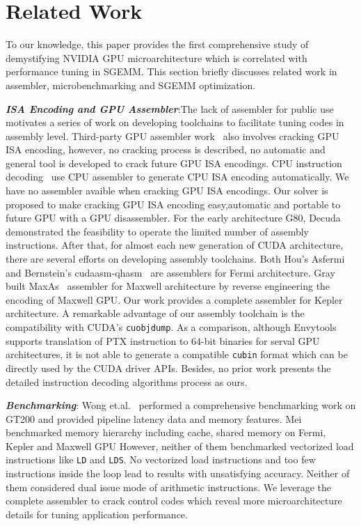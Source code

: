 \section{Related Work}
\label{sec:related}
To our knowledge, this paper provides the first comprehensive study of demystifying NVIDIA GPU microarchitecture which 
is correlated with performance tuning in SGEMM. This section briefly discusses related work in assembler, 
microbenchmarking and SGEMM optimization.

{\em {\bf ISA Encoding and GPU Assembler}}:The lack of assembler for public use motivates a series of work on developing toolchains to facilitate tuning codes in assembly level.
Third-party GPU assembler work~\cite{decuda,asfermi,maxas} also
involves cracking GPU ISA encoding, however, no cracking process is described,
no automatic and general tool is developed to crack future GPU ISA
encodings. CPU instruction decoding~\cite{collberg1997reverse,engler2000derive} use CPU assembler
to generate CPU ISA encoding automatically. We have no assembler avaible when cracking GPU ISA encodings. 
Our solver is proposed to make cracking GPU ISA encoding easy,automatic and portable to future GPU with a GPU disassembler.
For the early architecture G80, Decuda~\cite{decuda} demonstrated the feasibility to operate the 
limited number of assembly instructions. After that, for almost each new generation of CUDA architecture, there are several 
efforts on developing assembly toolchains. Both Hou's Asfermi~\cite{asfermi} and Bernstein's 
cudaasm-qhasm~\cite{bernstein2012usable} are assemblers for Fermi architecture. Gray built MaxAs~\cite{maxas} assembler 
for Maxwell architecture by reverse engineering the encoding of Maxwell GPU. Our work provides a complete assembler for 
Kepler architecture. A remarkable advantage of our assembly toolchain is the compatibility with CUDA's {\tt cuobjdump}. 
As a comparison, although Envytools~\cite{envytools} supports translation of PTX instruction to $64$-bit binaries 
for serval GPU architectures, it is not able to generate a compatible {\tt cubin} format which can be directly used by 
the CUDA driver APIs. Besides, no prior work presents the detailed instruction decoding algorithms process as ours.

{\em {\bf Benchmarking}}: Wong et.al.~\cite{wong} performed a 
comprehensive benchmarking work on GT200 and provided pipeline latency data and
memory features. Mei~\cite{mei} benchmarked memory hierarchy including cache, shared memory on Fermi, Kepler and Maxwell GPU
However, neither of them benchmarked 
vectorized load instructions like {\tt LD} and {\tt LDS}. 
No vectorized load instructions and too few instructions inside the loop lead to results with unsatisfying accuracy.
Neither of them considered dual issue mode of 
arithmetic instructions. We leverage the complete assembler to crack control codes which reveal more 
microarchitecture details for tuning application performance.

